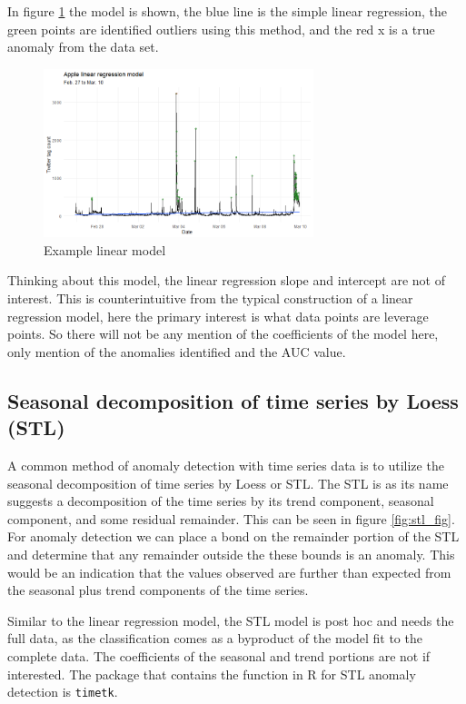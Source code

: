 \documentclass{article}
\begin{document}
In figure \ref{fig:lm_fig} the model is shown, the blue line is the simple linear regression, the green points are identified outliers using this method, and the red x is a true anomaly from the data set.

\begin{figure}[hb]
    \centering
    \includegraphics[width=0.7\textwidth]{linear_model.png}
    \caption{Example linear model}
    \label{fig:lm_fig}
\end{figure}

Thinking about this model, the linear regression slope and intercept are not of interest. This is counterintuitive from the typical construction of a linear regression model, here the primary interest is what data points are leverage points. So there will not be any mention of the coefficients of the model here, only mention of the anomalies identified and the AUC value.

\subsection{Seasonal decomposition of time series by Loess (STL)}
A common method of anomaly detection with time series data is to utilize the seasonal decomposition of time series by Loess or STL. The STL is as its name suggests a decomposition of the time series by its trend component, seasonal component, and some residual remainder. This can be seen in figure \ref{fig:stl_fig}. For anomaly detection we can place a bond on the remainder portion of the STL and determine that any remainder outside the these bounds is an anomaly. This would be an indication that the values observed are further than expected from the seasonal plus trend components of the time series.

Similar to the linear regression model, the STL model is post hoc and needs the full data, as the classification comes as a byproduct of the model fit to the complete data. The coefficients of the seasonal and trend portions are not if interested. The package that contains the function in R for STL anomaly detection is \texttt{timetk}.
\end{document}
